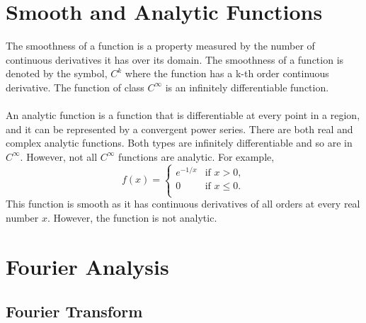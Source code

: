 \documentclass[12pt]{article}
\begin{document}
\begin{flushleft}
\section{Smooth and Analytic Functions}

\qquad The smoothness of a function is a property measured by the number of continuous derivatives it has over its domain. The smoothness of a function is denoted by the symbol, $C^k$ where the function has a k-th order continuous derivative. The function of class $C^\infty$ is an infinitely differentiable function. 
\\~\\
\qquad An analytic function is a function that is differentiable at every point in a region, and it can be represented by a convergent power series. There are both real and complex analytic functions. Both types are infinitely differentiable and so are in $C^\infty$. However, not all $C^\infty$ functions are analytic. For example,
\[ f(x) = \begin{cases} 
      e^{-1/x} & \text{if }x>0, \\
      0 & \text{if }x\leq 0. \\ 
   \end{cases}
\]
This function is smooth as it has continuous derivatives of all orders at every real number $x$. However, the function is not analytic.

\section{Fourier Analysis}
\subsection{Fourier Transform}


\end{flushleft}
\end{document}
